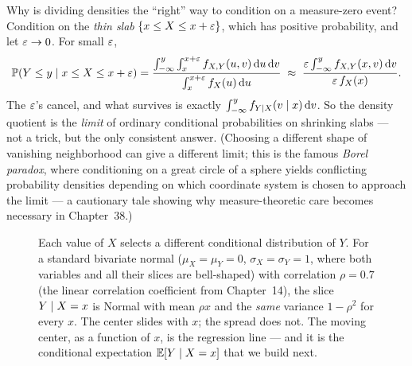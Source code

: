 \begin{whybox}
Why is dividing densities the ``right'' way to condition on a measure-zero event? Condition on the
\emph{thin slab} $\{x \le X \le x + \varepsilon\}$, which has positive probability, and let $\varepsilon \to 0$.
For small $\varepsilon$,
\[
  \operatorname{\mathbb{P}}(Y \le y \mid x \le X \le x+\varepsilon)
  = \frac{\int_{-\infty}^{y}\int_x^{x+\varepsilon} f_{X,Y}(u,v)\,\mathrm{d} u\,\mathrm{d} v}
         {\int_x^{x+\varepsilon} f_X(u)\,\mathrm{d} u}
  \;\approx\; \frac{\varepsilon \int_{-\infty}^{y} f_{X,Y}(x,v)\,\mathrm{d} v}{\varepsilon\, f_X(x)}.
\]
The $\varepsilon$'s cancel, and what survives is exactly $\int_{-\infty}^{y} f_{Y\mid X}(v \mid x)\,\mathrm{d} v$.
So the density quotient is the \emph{limit} of ordinary conditional probabilities on shrinking slabs ---
not a trick, but the only consistent answer. (Choosing a different shape of vanishing neighborhood can
give a different limit; this is the famous \emph{Borel paradox}, where conditioning on a great circle of a
sphere yields conflicting probability densities depending on which coordinate system is chosen to approach
the limit --- a cautionary tale showing why measure-theoretic care becomes necessary in Chapter~38.)
\end{whybox}

\begin{figure}[H]
\centering
{}
\caption{Each value of $X$ selects a different conditional distribution of $Y$. For a standard bivariate normal
($\mu_X = \mu_Y = 0$, $\sigma_X = \sigma_Y = 1$, where both variables and all their slices are bell-shaped) with correlation
$\rho = 0.7$ (the linear correlation coefficient from Chapter~14), the slice $Y \mid X = x$ is Normal
with mean $\rho x$ and the \emph{same} variance $1-\rho^2$ for every $x$. The center slides with $x$; the
spread does not. The moving center, as a function of $x$, is the regression line --- and it is the conditional
expectation $\operatorname{\mathbb{E}}[Y \mid X = x]$ that we build next.}
\label{ch15:fig-slices}
\end{figure}

